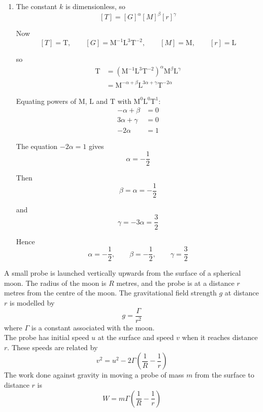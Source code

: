\documentclass[leqno]{article}
\begin{document}
\begin{enumerate}[
  label=\textbf{\arabic*.},
  leftmargin=*,
  topsep=0pt,
  partopsep=0pt,
  parsep=0pt
]
\begin{djsSolution}
\begin{enumerate}[label=\textbf{(\alph*)}, start=1]
  the dimensions of \(G\) are
  \[
  [G]=\mathrm{M^{-1}L^3T^{-2}}
  \]

  \item The constant \(k\) is dimensionless, so
  \[
  [T]=[G]^\alpha[M]^\beta[r]^\gamma
  \]

  Now
  \[
  [T]=\mathrm{T},\qquad [G]=\mathrm{M^{-1}L^3T^{-2}},\qquad [M]=\mathrm{M},\qquad [r]=\mathrm{L}
  \]

  so
  \begin{align*}
  \mathrm{T}&=(\mathrm{M^{-1}L^3T^{-2}})^\alpha\mathrm{M}^\beta\mathrm{L}^\gamma \\
   &=\mathrm{M}^{-\alpha+\beta}\mathrm{L}^{3\alpha+\gamma}\mathrm{T}^{-2\alpha}
  \end{align*}

  Equating powers of \(\mathrm{M}\), \(\mathrm{L}\) and \(\mathrm{T}\) with \(\mathrm{M^0L^0T^1}\):
  \begin{align*}
  -\alpha+\beta&=0 \\
  3\alpha+\gamma&=0 \\
  -2\alpha&=1
  \end{align*}

  The equation \(-2\alpha=1\) gives
  \[
  \alpha=-\frac12
  \]

  Then
  \[
  \beta=\alpha=-\frac12
  \]

  and
  \[
  \gamma=-3\alpha=\frac32
  \]

  Hence
  \[
  \alpha=-\frac12,\qquad \beta=-\frac12,\qquad \gamma=\frac32
  \]
\end{enumerate}
\end{djsSolution}


\newpage

\questionitem

A small probe is launched vertically upwards from the surface of a spherical moon. The radius of the moon is $R$ metres, and the probe is at a distance $r$ metres from the centre of the moon. The gravitational field strength $g$ at distance $r$ is modelled by
\[
g = \frac{\Gamma}{r^2}
\]
where $\Gamma$ is a constant associated with the moon. \\

The probe has initial speed $u$ at the surface and speed $v$ when it reaches distance $r$. These speeds are related by
\[
v^2 = u^2 - 2\Gamma\left(\frac{1}{R}-\frac{1}{r}\right)
\]
The work done against gravity in moving a probe of mass $m$ from the surface to distance $r$ is
\[
W = m\Gamma\left(\frac{1}{R}-\frac{1}{r}\right)
\]


\end{enumerate}
\end{document}
